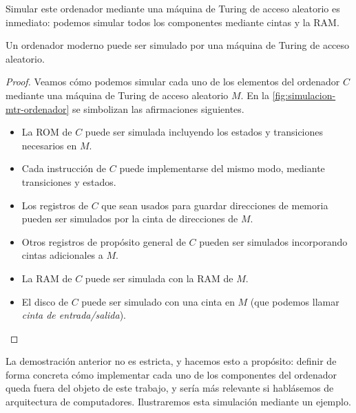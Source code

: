Simular este ordenador mediante una máquina de Turing de acceso aleatorio es inmediato: podemos simular todos los componentes mediante cintas y la RAM.

\begin{proposicion}\label{prop:aleatorio-a-ordenador}
Un ordenador moderno puede ser simulado por una máquina de Turing de acceso aleatorio.
\end{proposicion}
\begin{proof}
Veamos cómo podemos simular cada uno de los elementos del ordenador $C$ mediante una máquina de Turing de acceso aleatorio $M$. En la \cref{fig:simulacion-mtr-ordenador} se simbolizan las afirmaciones siguientes.
\begin{itemize}
    \item La ROM de $C$ puede ser simulada incluyendo los estados y transiciones necesarios en $M$.
    \item Cada instrucción de $C$ puede implementarse del mismo modo, mediante transiciones y estados.
    \item Los registros de $C$ que sean usados para guardar direcciones de memoria pueden ser simulados por la cinta de direcciones de $M$.
    \item Otros registros de propósito general de $C$ pueden ser simulados incorporando cintas adicionales a $M$.
    \item La RAM de $C$ puede ser simulada con la RAM de $M$.
    \item El disco de $C$ puede ser simulado con una cinta en $M$ (que podemos llamar \emph{cinta de entrada/salida}).\vspace*{-0.8cm}
\end{itemize}
\end{proof}

La demostración anterior no es estricta, y hacemos esto a propósito: definir de forma concreta cómo implementar cada uno de los componentes del ordenador queda fuera del objeto de este trabajo, y sería más relevante si hablásemos de arquitectura de computadores. Ilustraremos esta simulación mediante un ejemplo.

